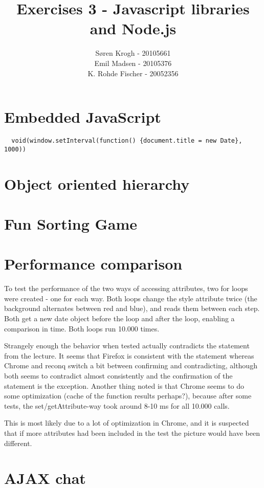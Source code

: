 \documentclass[a4paper,10pt]{article}
\author{
Søren Krogh -  20105661 \\
Emil Madsen - 20105376  \\
K. Rohde Fischer - 20052356\\}
\title{Exercises 3 - Javascript libraries and Node.js}
\begin{document}
\maketitle

\section*{Embedded JavaScript}

\begin{verbatim}
  void(window.setInterval(function() {document.title = new Date}, 1000))
\end{verbatim}


\section*{Object oriented hierarchy}

\section*{Fun Sorting Game}

\section*{Performance comparison}
To test the performance of the two ways of accessing attributes, two
for loops were created - one for each way.  Both loops change the
style attribute twice (the background alternates between red and
blue), and reads them between each step.  Both get a new date object
before the loop and after the loop, enabling a comparison in time.
Both loops run 10.000 times.

Strangely enough the behavior when tested actually contradicts the
statement from the lecture.  It seems that Firefox is consistent with
the statement whereas Chrome and reconq switch a bit between
confirming and contradicting, although both seems to contradict almost
consistently and the confirmation of the statement is the exception.
Another thing noted is that Chrome seems to do some optimization
(cache of the function results perhaps?), because after some tests,
the set/getAttribute-way took around 8-10 ms for all 10.000 calls.

This is most likely due to a lot of optimization in Chrome, and it is
suspected that if more attributes had been included in the test the
picture would have been different.

\section*{AJAX chat}
\end{document}
